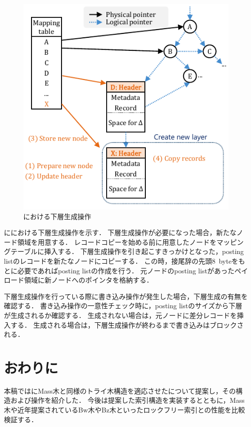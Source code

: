 \begin{figure}[t]
    \centering
    \includegraphics{./figures/layer.pdf}
    \caption{\Bcforest{}における下層生成操作}
    \label{fig:bc_tree_layer}
\end{figure}

\Fig{\ref{fig:bc_tree_layer}}に\Bcforest{}における下層生成操作を示す．
下層生成操作が必要になった場合，新たなノード領域を用意する．
レコードコピーを始める前に用意したノードをマッピングテーブルに挿入する．
下層生成操作を引き起こすきっかけとなった，posting listのレコードを新たなノードにコピーする．
この時，接尾辞の先頭8~byteをもとに必要であればposting listの作成を行う．
元ノードのposting listがあったペイロード領域に新ノードへのポインタを格納する．

下層生成操作を行っている際に書き込み操作が発生した場合，下層生成の有無を確認する．
書き込み操作の一意性チェック時に，posting listのサイズから下層が生成されるか確認する．
生成されない場合は，元ノードに差分レコードを挿入する．
生成される場合は，下層生成操作が終わるまで書き込みはブロックされる．

\section{おわりに}
\label{sec:conclusion}
本稿では\Bctree{}にMass木と同様のトライ木構造を適応させた\Bcforest{}について提案し，その構造および操作を紹介した．
今後は提案した索引構造を実装するとともに，Mass木や近年提案されているBw木やBz木といったロックフリー索引との性能を比較検証する．
